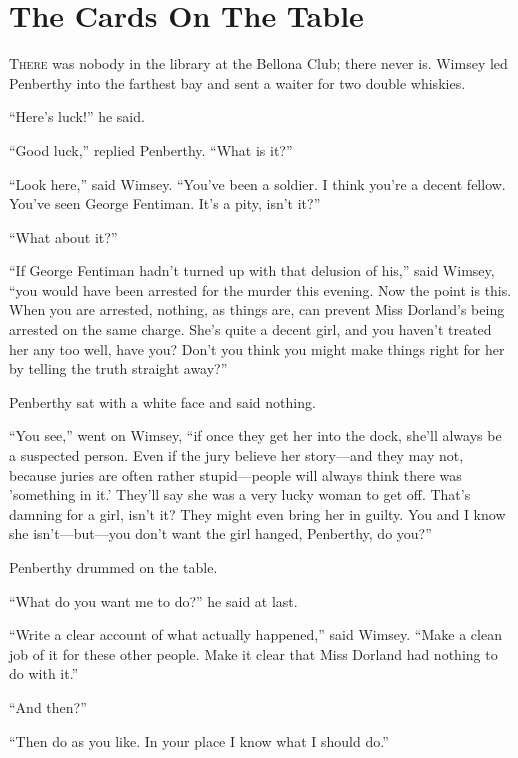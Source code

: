 \chapter{The Cards On The Table}

\lettrine[lines=4]{T}{here} was nobody in the library at the Bellona Club; there never is. Wimsey led Penberthy into the farthest bay and sent a waiter for two double whiskies.

\enquote{Here's luck!} he said.

\enquote{Good luck,} replied Penberthy. \enquote{What is it?}

\enquote{Look here,} said Wimsey. \enquote{You've been a soldier. I think you're a decent fellow. You've seen George Fentiman. It's a pity, isn't it?}

\enquote{What about it?}

\enquote{If George Fentiman hadn't turned up with that delusion of his,} said Wimsey, \enquote{you would have been arrested for the murder this evening. Now the point is this. When you are arrested, nothing, as things are, can prevent Miss Dorland's being arrested on the same charge. She's quite a decent girl, and you haven't treated her any too well, have you? Don't you think you might make things right for her by telling the truth straight away?}

Penberthy sat with a white face and said nothing.

\enquote{You see,} went on Wimsey, \enquote{if once they get her into the dock, she'll always be a suspected person. Even if the jury believe her story\allowbreak---\allowbreak and they may not, because juries are often rather stupid\allowbreak---\allowbreak people will always think there was 'something in it.' They'll say she was a very lucky woman to get off. That's damning for a girl, isn't it? They might even bring her in guilty. You and I know she isn't\allowbreak---\allowbreak but---you don't want the girl hanged, Penberthy, do you?}

Penberthy drummed on the table.

\enquote{What do you want me to do?} he said at last.

\enquote{Write a clear account of what actually happened,} said Wimsey. \enquote{Make a clean job of it for these other people. Make it clear that Miss Dorland had nothing to do with it.}

\enquote{And then?}

\enquote{Then do as you like. In your place I know what I should do.}

